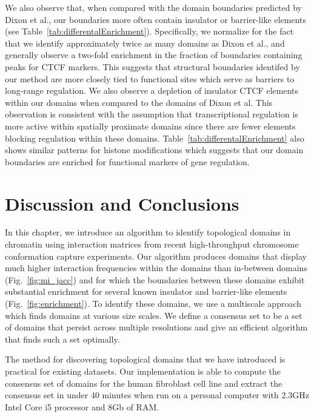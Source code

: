 \documentclass[12pt]{cmuthesis}
\begin{document}
  We also observe that, when compared with the domain boundaries predicted by Dixon et al., our boundaries more often contain insulator or barrier-like elements (see Table~\ref{tab:differentalEnrichment}). Specifically, we normalize for the fact that we identify approximately twice as many domains as Dixon et al., and generally observe a two-fold enrichment in the fraction of boundaries containing
  peaks for CTCF markers. This suggests that structural boundaries identifed by our method are more closely tied to functional sites which serve as barriers to long-range regulation. We also observe a depletion of insulator CTCF elements within our domains when compared to the domains of Dixon et al.  This observation is consistent with the assumption that transcriptional regulation is more active within spatially proximate domains since there are fewer elements blocking regulation within these domains.  Table~\ref{tab:differentalEnrichment} also shows similar patterns for histone modifications which suggests that our domain boundaries are enriched for functional markers of gene regulation.

\section{Discussion and Conclusions}

  In this chapter, we introduce an algorithm to identify topological domains in chromatin using interaction matrices from recent high-throughput chromosome conformation capture experiments.  Our algorithm produces domains that display much higher interaction frequencies within the domains than in-between domains (Fig.~\ref{fig:mi_jacc}) and for which the boundaries between these domains exhibit substantial enrichment for several known insulator and barrier-like elements (Fig.~\ref{fig:enrichment}).  To identify these domains, we use a multiscale approach which finds domains at various size scales.  %
  We define a consensus set to be a set of domains that persist across multiple resolutions and give an efficient algorithm that finds such a set optimally.

  The method for discovering topological domains that we have introduced is practical for existing datasets.  Our implementation is able to compute the consensus set of domains for the human fibroblast cell line and extract the consensus set in under 40 minutes when run on a personal computer with 2.3GHz Intel Core i5 processor and 8Gb of RAM.
\end{document}
